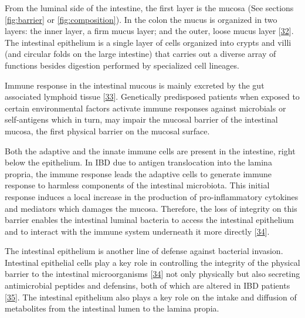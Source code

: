 \documentclass[
  12pt,
  a4paper,
  twoside,
  openright]{book}
\begin{document}
From the luminal side of the intestine, the first layer is the mucosa (See sections \ref{fig:barrier} or \ref{fig:composition}).
In the colon the mucus is organized in two layers: the inner layer, a firm mucus layer; and the outer, loose mucus layer {[}\protect\hyperlink{ref-okumura2017}{32}{]}.
The intestinal epithelium is a single layer of cells organized into crypts and villi (and circular folds on the large intestine) that carries out a diverse array of functions besides digestion performed by specialized cell lineages.

Immune response in the intestinal mucous is mainly excreted by the gut associated lymphoid tissue {[}\protect\hyperlink{ref-faria2012}{33}{]}.
Genetically predisposed patients when exposed to certain environmental factors activate immune responses against microbials or self-antigens which in turn, may impair the mucosal barrier of the intestinal mucosa, the first physical barrier on the mucosal surface.

Both the adaptive and the innate immune cells are present in the intestine, right below the epithelium.
In IBD due to antigen translocation into the lamina propria, the immune response leads the adaptive cells to generate immune response to harmless components of the intestinal microbiota.
This initial response induces a local increase in the production of pro-inflammatory cytokines and mediators which damages the mucosa.
Therefore, the loss of integrity on this barrier enables the intestinal luminal bacteria to access the intestinal epithelium and to interact with the immune system underneath it more directly {[}\protect\hyperlink{ref-hisamatsu2013}{34}{]}.

The intestinal epithelium is another line of defense against bacterial invasion.
Intestinal epithelial cells play a key role in controlling the integrity of the physical barrier to the intestinal microorganisms {[}\protect\hyperlink{ref-hisamatsu2013}{34}{]} not only physically but also secreting antimicrobial peptides and defensins, both of which are altered in IBD patients {[}\protect\hyperlink{ref-michielan2015}{35}{]}.
The intestinal epithelium also plays a key role on the intake and diffusion of metabolites from the intestinal lumen to the lamina propia.
\end{document}

